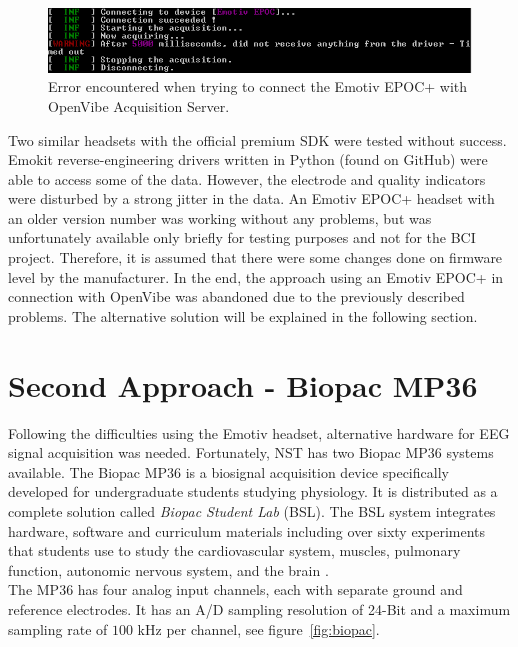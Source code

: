 \documentclass[a4paper,twoside, openright,12pt]{report}
\begin{document}
\begin{figure}[h]
	\centering
	\includegraphics[width=0.8\linewidth]{./gfx/epoc_errorcode}
	\caption{Error encountered when trying to connect the Emotiv EPOC+ with OpenVibe Acquisition Server.}
	\label{fig:epoc_error}
\end{figure}

Two similar headsets with the official premium SDK were tested without success. Emokit reverse-engineering drivers written in Python (found on GitHub) were able to access some of the data. However, the electrode and quality indicators were disturbed by a strong jitter in the data. An Emotiv EPOC+ headset with an older version number was working without any problems, but was unfortunately available only briefly for testing purposes and not for the BCI project. Therefore, it is assumed that there were some changes done on firmware level by the manufacturer. In the end, the approach using an Emotiv EPOC+ in connection with OpenVibe was abandoned due to the previously described problems. The alternative solution will be explained in the following section.

\section{Second Approach - Biopac MP36}
Following the difficulties using the Emotiv headset, alternative hardware for EEG signal acquisition was needed. Fortunately, NST has two Biopac MP36 systems available. The Biopac MP36 is a biosignal acquisition device specifically developed for undergraduate students studying physiology. It is distributed as a complete solution called \textit{Biopac Student Lab} (BSL). The BSL system integrates hardware, software and curriculum materials including over sixty experiments that students use to study the cardiovascular system, muscles, pulmonary function, autonomic nervous system, and the brain \cite{biopac_general}.\\
The MP36 has four analog input channels, each with separate ground and reference electrodes. It has an A/D sampling resolution of 24-Bit and a maximum sampling rate of $100$ kHz per channel, see figure~\ref*{fig:biopac}.
\end{document}

